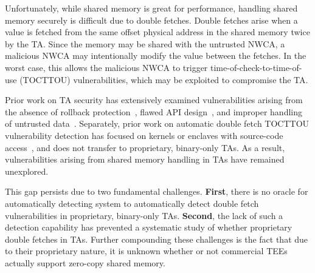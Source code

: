 \documentclass[conference]{IEEEtran} %
\providecommand{\DIFaddtex}[1]{{\protect\color{blue} \sf #1}} %
\providecommand{\DIFdeltex}[1]{{\protect\color{red} \scriptsize #1}} %
\providecommand{\DIFaddbegin}{} %
\providecommand{\DIFaddend}{} %
\providecommand{\DIFdelbegin}{} %
\providecommand{\DIFdelend}{} %
\providecommand{\DIFadd}[1]{\texorpdfstring{\DIFaddtex{#1}}{#1}} %
\providecommand{\DIFdel}[1]{\texorpdfstring{\DIFdeltex{#1}}{}} %
\begin{document}
Unfortunately, while shared memory is great for performance, handling shared 
memory securely is difficult due to double fetches. Double fetches arise when 
a value is fetched from the same \DIFdelbegin \DIFdel{offset }\DIFdelend \DIFaddbegin \DIFadd{physical address }\DIFaddend in the shared memory twice by the TA. 
Since the memory may be shared with the untrusted NWCA, a malicious NWCA may intentionally 
modify the value between the fetches. 
In the worst case, this allows the malicious NWCA to trigger time-of-check-to-time-of-use (TOCTTOU) 
vulnerabilities, which may be exploited to compromise the TA.

Prior work on TA security has extensively examined vulnerabilities arising from 
the absence of rollback protection~\cite{rollback}, flawed API design~\cite{globalconfusion}, 
and improper handling of untrusted data~\cite{AdamskiGuilbonPeterlin2019SamsungTrustZone,teezz,trustdies}. 
Separately, prior work on automatic \DIFdelbegin \DIFdel{double fetch }\DIFdelend \DIFaddbegin \DIFadd{TOCTTOU }\DIFaddend vulnerability detection has focused on kernels 
or enclaves with source-code access~\cite{decaf,deadline,wang2017double,chen2024enclavefuzz}, 
and does not transfer to proprietary, binary-only TAs. 
As a result, vulnerabilities arising from shared memory handling in TAs have remained unexplored.

\DIFdelbegin %
\DIFdelend This gap persists due to two fundamental challenges. \textbf{First}, there is no \DIFdelbegin \DIFdel{oracle for
automatically detecting }\DIFdelend \DIFaddbegin \DIFadd{system to 
automatically detect }\DIFaddend double fetch vulnerabilities in proprietary, binary-only TAs.
\textbf{Second}, the lack of such a detection capability has prevented a systematic study of
\DIFdelbegin \DIFdel{whether proprietary }\DIFdelend \DIFaddbegin \DIFadd{double fetches in TAs. Further compounding these challenges is the fact that due to their 
proprietary nature, it is unknown whether or not }\DIFaddend commercial TEEs actually support 
zero-copy shared memory. 
\end{document}
